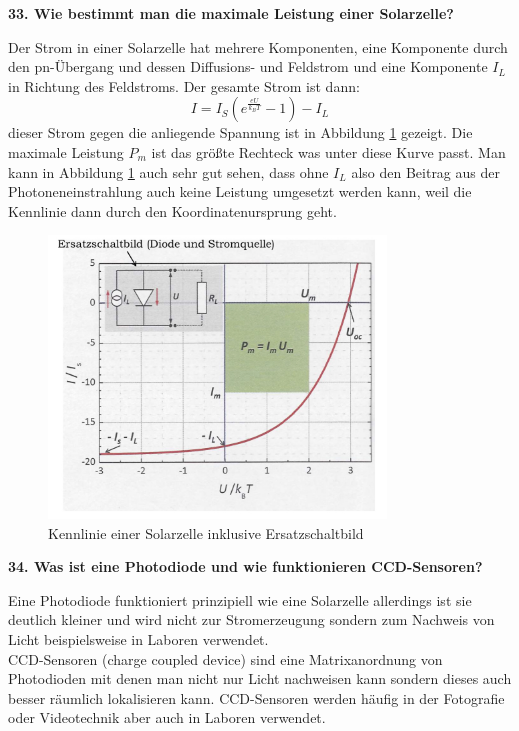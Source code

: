 \noindent\textbf{33. Wie bestimmt man die maximale Leistung einer Solarzelle?}\\
\begin{addmargin}[25pt]{0pt}
Der Strom in einer Solarzelle hat mehrere Komponenten, eine Komponente durch den pn-Übergang und dessen Diffusions- und Feldstrom und eine Komponente $I_L$ in Richtung des Feldstroms. Der gesamte Strom ist dann:
\begin{equation}\label{eq:Kennlinie_Solarzelle}
    I = I_S\left(e^{\frac{eU}{k_BT}}-1\right) - I_L
\end{equation}
dieser Strom gegen die anliegende Spannung ist in Abbildung \ref{fig:Solarzelle} gezeigt. Die maximale Leistung $P_m$ ist das größte Rechteck was unter diese Kurve passt. Man kann in Abbildung \ref{fig:Solarzelle} auch sehr gut sehen, dass ohne $I_L$ also den Beitrag aus der Photoneneinstrahlung auch keine Leistung umgesetzt werden kann, weil die Kennlinie dann durch den Koordinatenursprung geht. 
\begin{figure}[h]
    \centering
    \includegraphics[width = 0.8\textwidth]{images/KM2/Solarzelle.jpeg}
    \caption{Kennlinie einer Solarzelle inklusive Ersatzschaltbild}
    \label{fig:Solarzelle}
\end{figure}
\end{addmargin}

\noindent\textbf{34. Was ist eine Photodiode und wie funktionieren CCD-Sensoren?}\\
\begin{addmargin}[25pt]{0pt}
Eine Photodiode funktioniert prinzipiell wie eine Solarzelle allerdings ist sie deutlich kleiner und wird nicht zur Stromerzeugung sondern zum Nachweis von Licht beispielsweise in Laboren verwendet.\\ 
CCD-Sensoren (charge coupled device) sind eine Matrixanordnung von Photodioden mit denen man nicht nur Licht nachweisen kann sondern dieses auch besser räumlich lokalisieren kann. CCD-Sensoren werden häufig in der Fotografie oder Videotechnik aber auch in Laboren verwendet.
\end{addmargin}

